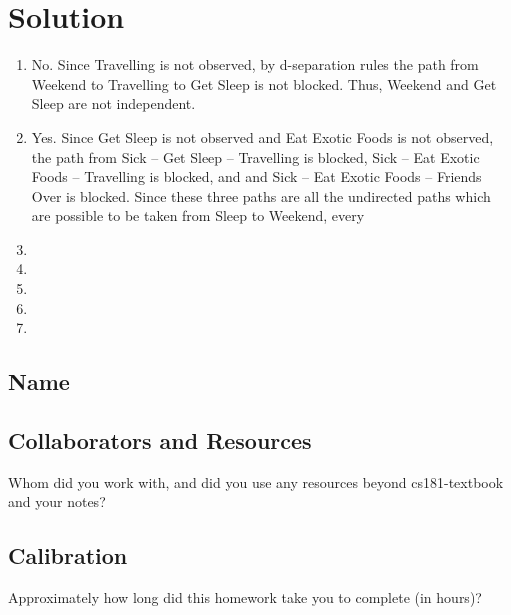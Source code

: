 \documentclass[submit]{harvardml}
\begin{document}
\newpage
\section*{Solution}
\begin{enumerate}
  \item No. Since Travelling is not observed, by d-separation rules the path from Weekend to Travelling to Get Sleep is not blocked. Thus, Weekend and Get Sleep are not independent.
  
  \item Yes. Since Get Sleep is not observed and Eat Exotic Foods is not observed, the path from Sick -- Get Sleep  -- Travelling is blocked, Sick -- Eat Exotic Foods -- Travelling is blocked, and and Sick -- Eat Exotic Foods -- Friends Over is blocked. Since these three paths are all the undirected paths which are possible to be taken from Sleep to Weekend, every
  \item 
  \item 
  \item 
  \item 
  \item 
\end{enumerate}

\newpage
\subsection*{Name}

\subsection*{Collaborators and Resources}
Whom did you work with, and did you use any resources beyond cs181-textbook and your notes?

\subsection*{Calibration}
Approximately how long did this homework take you to complete (in hours)? 
\end{document}
